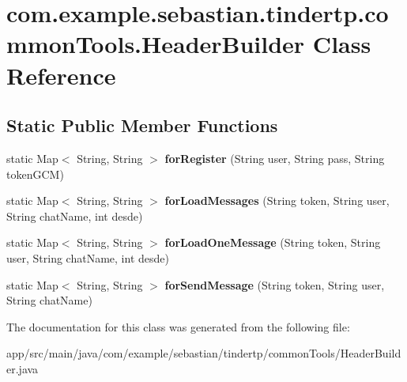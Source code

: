\hypertarget{classcom_1_1example_1_1sebastian_1_1tindertp_1_1commonTools_1_1HeaderBuilder}{}\section{com.\+example.\+sebastian.\+tindertp.\+common\+Tools.\+Header\+Builder Class Reference}
\label{classcom_1_1example_1_1sebastian_1_1tindertp_1_1commonTools_1_1HeaderBuilder}
\subsection*{Static Public Member Functions}
\begin{DoxyCompactItemize}
\item 
static Map$<$ String, String $>$ {\bfseries for\+Register} (String user, String pass, String token\+G\+CM)\hypertarget{classcom_1_1example_1_1sebastian_1_1tindertp_1_1commonTools_1_1HeaderBuilder_a071ac3f482cc676a4f7b597d05603c9a}{}\label{classcom_1_1example_1_1sebastian_1_1tindertp_1_1commonTools_1_1HeaderBuilder_a071ac3f482cc676a4f7b597d05603c9a}

\item 
static Map$<$ String, String $>$ {\bfseries for\+Load\+Messages} (String token, String user, String chat\+Name, int desde)\hypertarget{classcom_1_1example_1_1sebastian_1_1tindertp_1_1commonTools_1_1HeaderBuilder_a331d7f32ce59ed020c95f72ed57b1a0b}{}\label{classcom_1_1example_1_1sebastian_1_1tindertp_1_1commonTools_1_1HeaderBuilder_a331d7f32ce59ed020c95f72ed57b1a0b}

\item 
static Map$<$ String, String $>$ {\bfseries for\+Load\+One\+Message} (String token, String user, String chat\+Name, int desde)\hypertarget{classcom_1_1example_1_1sebastian_1_1tindertp_1_1commonTools_1_1HeaderBuilder_ac5e976c907fa229b441472fad5b7002b}{}\label{classcom_1_1example_1_1sebastian_1_1tindertp_1_1commonTools_1_1HeaderBuilder_ac5e976c907fa229b441472fad5b7002b}

\item 
static Map$<$ String, String $>$ {\bfseries for\+Send\+Message} (String token, String user, String chat\+Name)\hypertarget{classcom_1_1example_1_1sebastian_1_1tindertp_1_1commonTools_1_1HeaderBuilder_a3af3ce0574fc469716faed5f89283712}{}\label{classcom_1_1example_1_1sebastian_1_1tindertp_1_1commonTools_1_1HeaderBuilder_a3af3ce0574fc469716faed5f89283712}

\end{DoxyCompactItemize}


The documentation for this class was generated from the following file\+:\begin{DoxyCompactItemize}
\item 
app/src/main/java/com/example/sebastian/tindertp/common\+Tools/Header\+Builder.\+java\end{DoxyCompactItemize}

